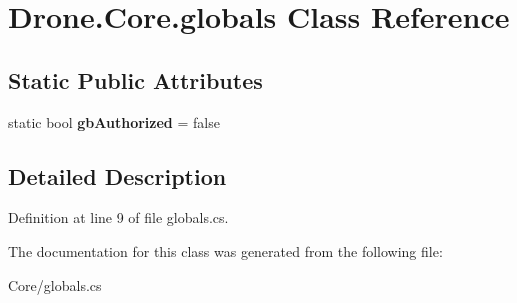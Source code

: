 \hypertarget{class_drone_1_1_core_1_1globals}{}\section{Drone.\+Core.\+globals Class Reference}
\label{class_drone_1_1_core_1_1globals}
\subsection*{Static Public Attributes}
\begin{DoxyCompactItemize}
\item 
\hypertarget{class_drone_1_1_core_1_1globals_a181e47300f2ef8a3457b7cca886ec925}{}static bool {\bfseries gb\+Authorized} = false\label{class_drone_1_1_core_1_1globals_a181e47300f2ef8a3457b7cca886ec925}

\end{DoxyCompactItemize}


\subsection{Detailed Description}


Definition at line 9 of file globals.\+cs.



The documentation for this class was generated from the following file\+:\begin{DoxyCompactItemize}
\item 
Core/globals.\+cs\end{DoxyCompactItemize}
